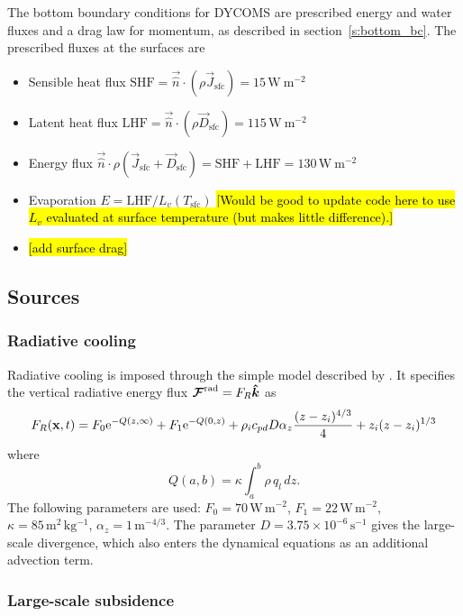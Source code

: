 \documentclass{report}
\begin{document}
The bottom boundary conditions for DYCOMS are prescribed energy and water fluxes and a drag law for momentum, as described in section~\ref{s:bottom_bc}. The prescribed fluxes at the surfaces are
\begin{itemize} 
\item Sensible heat flux $\mathrm{SHF} = \vec{\hat n} \cdot (\rho \vec{J}_{\mathrm{sfc}}) = 15\,\mathrm{W~m{^{-2}}}$
\item Latent heat flux $\mathrm{LHF} = \vec{\hat n} \cdot (\rho \vec{D}_{\mathrm{sfc}}) = 115\,\mathrm{W~m^{-2}}$
\item Energy flux $\vec{\hat n} \cdot \rho (\vec{J}_{\mathrm{sfc}} + \vec{D}_{\mathrm{sfc}}) = \mathrm{SHF + LHF} = 130\,\mathrm{W~m^{-2}}$
\item Evaporation $E = \mathrm{LHF}/L_{v}(T_\mathrm{sfc})$ \hl{[Would be good to update code here to use $L_v$ evaluated at surface temperature (but makes little difference).]}
\item \hl{[add surface drag]}
\end{itemize}

\subsection{Sources}

\subsubsection{Radiative cooling}
Radiative cooling is imposed through the simple model described by \cite{Stevens05a}. It specifies the vertical radiative energy flux $\boldsymbol{{\mathcal{F}}}^{\mathrm{rad}} = F_R \boldsymbol{{\hat k}}$ as
\begin{equation}
    \label{e:radiativeStevens05}
    F_{R}({\bf x}, t) = F_0{\rm e}^{-Q(z,\infty)} +
    F_1{\rm e}^{-Q(0, z)} +
    \rho_i c_{pd} D \alpha_z\frac{(z-z_i)^{4/3}}{4} + z_i(z - z_i)^{1/3}
\end{equation}
where 
\begin{equation}
    Q(a,b) = \kappa\int_{a}^{b}\rho\,q_l\,dz.
\end{equation}
The following parameters are used:
$F_0=70\,\mathrm{W\,m^{-2}}$, $F_1=22\,\mathrm{W\,m^{-2}}$, $\kappa=85\,\mathrm{m^2\,kg^{-1}}$, $\alpha_z=1\,\mathrm{m^{-4/3}}$. The parameter $D=3.75\times 10^{-6}\,\mathrm{s^{-1}}$ gives the large-scale divergence, which also enters the dynamical equations as an additional advection term.  

\subsubsection{Large-scale subsidence}
\end{document}
